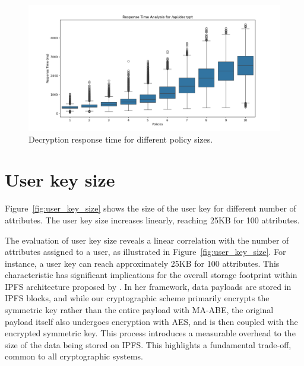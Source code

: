 \documentclass[cic,tc,english]{iiufrgs}
\numberwithin{algorithm}{chapter}
\begin{document}
            \begin{figure}
                \centering
                \includegraphics[width=\textwidth]{images/phase4/response_time_api_decrypt.png}
                \caption{Decryption response time for different policy sizes.}
                \label{fig:decrypt_policy_size}
            \end{figure}

        
        \section{User key size}
            \label{sec:keysize}
            Figure~\ref{fig:user_key_size} shows the size of the user key for different number of attributes. The user key size increases linearly, reaching 25KB for 100 attributes.

            The evaluation of user key size reveals a linear correlation with the number of attributes assigned to a user, as illustrated in Figure~\ref{fig:user_key_size}. For instance, a user key can reach approximately 25KB for 100 attributes. This characteristic has significant implications for the overall storage footprint within IPFS architecture proposed by \citet{laura2023}. In her framework, data payloads are stored in IPFS blocks, and while our cryptographic scheme primarily encrypts the symmetric key rather than the entire payload with MA-ABE, the original payload itself also undergoes encryption with AES, and is then coupled with the encrypted symmetric key. This process introduces a measurable overhead to the size of the data being stored on IPFS. This highlights a fundamental trade-off, common to all cryptographic systems.
\end{document}

